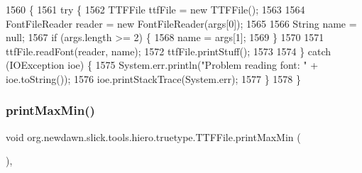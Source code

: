 \begin{DoxyCode}
1560                                            \{
1561         \textcolor{keywordflow}{try} \{
1562             TTFFile ttfFile = \textcolor{keyword}{new} TTFFile();
1563 
1564             FontFileReader reader = \textcolor{keyword}{new} FontFileReader(args[0]);
1565 
1566             String name = null;
1567             \textcolor{keywordflow}{if} (args.length >= 2) \{
1568                 name = args[1];
1569             \}
1570 
1571             ttfFile.readFont(reader, name);
1572             ttfFile.printStuff();
1573 
1574         \} \textcolor{keywordflow}{catch} (IOException ioe) \{
1575             System.err.println(\textcolor{stringliteral}{"Problem reading font: "} + ioe.toString());
1576             ioe.printStackTrace(System.err);
1577         \}
1578     \}
\end{DoxyCode}
\mbox{\label{classorg_1_1newdawn_1_1slick_1_1tools_1_1hiero_1_1truetype_1_1_t_t_f_file_a08d673cae8b55d634dff85cb0c283c3d}} 
\subsubsection{\texorpdfstring{print\+Max\+Min()}{printMaxMin()}}
{\footnotesize\ttfamily void org.\+newdawn.\+slick.\+tools.\+hiero.\+truetype.\+T\+T\+F\+File.\+print\+Max\+Min (\begin{DoxyParamCaption}{ }\end{DoxyParamCaption})\hspace{0.3cm}{\ttfamily [inline]}, {\ttfamily [private]}}


